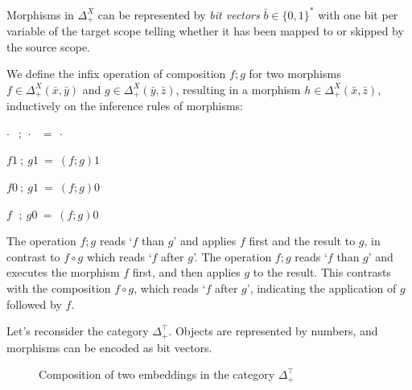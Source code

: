 \documentclass[runningheads]{llncs}
\begin{document}
\begin{remark}
  Morphisms in $Δ_+^X$ can be represented by \emph{bit vectors} $\bar{b} ∈ \{0, 1\}^*$ with one bit per variable of the target scope telling whether it has been mapped to or skipped by the source scope.
\end{remark}
\begin{definition}
  We define the infix operation of composition $f;g$ for two morphisms $f ∈ Δ_+^X(\bar{x}, \bar{y})$ and $g ∈ Δ_+^X(\bar{y}, \bar{z})$, resulting in a morphism $h ∈ Δ_+^X(\bar{x}, \bar{z})$, inductively on the inference rules of morphisms:

  \quad $·  \ \ \, \, ; \ · \ \ \ = \ ·$

  \quad $f 1  \ ; \ g 1 \ = \ (f;g)1$

  \quad $f 0 \ ; \ g 1  \ = \ (f;g)0$

  \quad $f \ \ \, ; \ g 0 \ = \ (f;g)0$
\end{definition}
\begin{remark}
  The operation $f;g$ reads `$f$ than $g$' and applies $f$ first and the result to $g$, in contrast to $f ∘ g$ which reads `$f$ after $g$'. 
  The operation $f;g$ reads `$f$ than $g$' and executes the morphism $f$ first, and then applies $g$ to the result. 
  This contrasts with the composition $f ∘ g$, which reads `$f$ after $g$', indicating the application of $g$ followed by $f$.
\end{remark}
\begin{example}
  Let's reconsider the category $Δ_+^⊤$. Objects are represented by numbers, and morphisms can be encoded as bit vectors.
  \begin{figure}[h]
    \centering
    \caption{Composition of two embeddings in the category $Δ_+^⊤$}
    \label{fig:ex2}
  \end{figure}
\end{example}
\end{document}
